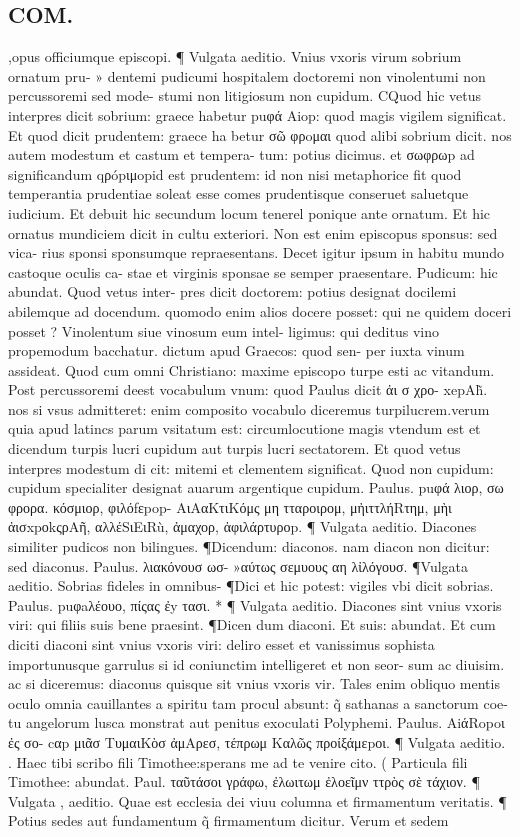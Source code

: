 \documentclass{article}
\begin{document}
\begin{pages}
\section*{COM. }
\marginpar{[ p.3 ]}\pstart ,opus officiumque episcopi. ¶ Vulgata aeditio. Vnius vxoris virum sobrium ornatum pru- » dentemi pudicumi hospitalem doctoremi non vinolentumi non percussoremi sed mode- stumi non litigiosum non cupidum. CQuod hic vetus interpres dicit sobrium: graece habetur puφά Aiop: quod magis vigilem significat. Et quod dicit prudentem: graece ha betur σῶ φρoμαι quod alibi sobrium dicit. nos autem modestum et castum et tempera- tum: potius dicimus. et σωφρωp ad significandum qρópιμopid est prudentem: id non nisi metaphorice fit quod temperantia prudentiae soleat esse comes prudentisque conseruet saluetque iudicium. Et debuit hic secundum locum tenerel ponique ante ornatum. Et hic ornatus mundiciem dicit in cultu exteriori. Non est enim episcopus sponsus: sed vica- rius sponsi sponsumque repraesentans. Decet igitur ipsum in habitu mundo castoque oculis ca- stae et virginis sponsae se semper praesentare. Pudicum: hic abundat. Quod vetus inter- pres dicit doctorem: potius designat docilemi abilemque ad docendum. quomodo enim alios docere posset: qui ne quidem doceri posset ? Vinolentum siue vinosum eum intel- ligimus: qui deditus vino propemodum bacchatur. dictum apud Graecos: quod sen- per iuxta vinum assideat. Quod cum omni Christiano: maxime episcopo turpe esti ac vitandum. Post percussoremi deest vocabulum vnum: quod Paulus dicit ἀι σ χρο- xepAh̃. nos si vsus admitteret: enim composito vocabulo diceremus turpilucrem.verum quia apud latincs parum vsitatum est: circumlocutione magis vtendum est et dicendum turpis lucri cupidum aut turpis lucri sectatorem. Et quod vetus interpres modestum di cit: mitemi et clementem significat. Quod non cupidum: cupidum specialiter designat auarum argentique cupidum. Paulus. puφά λιορ, σω φρορα. κόσμιορ, φιλόfεpop- AιΑαΚτιΚόμς μη τταροιρομ, μἠιττλήRτημ, μὴι ἀισxpοkςρAῆ, αλλέSιEιRù, ἀμαχορ, ἀφιλάρτυροp. ¶ Vulgata aeditio. Diacones similiter pudicos non bilingues. ¶Dicendum: diaconos. nam diacon non dicitur: sed diaconus. Paulus. λιακόνουσ ωσ- »αύτως σεμυους αη λἰλόγουσ. ¶Vulgata aeditio. Sobrias fideles in omnibus- ¶Dici et hic potest: vigiles vbi dicit sobrias. Paulus. puφaλέουο, πίςας ἐy τασι. * ¶ Vulgata aeditio. Diacones sint vnius vxoris viri: qui filiis suis bene praesint. ¶Dicen dum diaconi. Et suis: abundat. Et cum diciti diaconi sint vnius vxoris viri: deliro esset et vanissimus sophista importunusque garrulus si id coniunctim intelligeret et non seor- sum ac diuisim. ac si diceremus: diaconus quisque sit vnius vxoris vir. Tales enim obliquo mentis oculo omnia cauillantes a spiritu tam procul absunt: q̃ sathanas a sanctorum coe- tu angelorum lusca monstrat aut penitus exoculati Polyphemi. Paulus. AiάRopoι ἐς σο- cαp μιᾶσ ΤυμαιΚὸσ ἀμAρεσ, τέπρωμ Καλῶς προίξάμεpοι. ¶ Vulgata aeditio. . Haec tibi scribo fili Timothee:sperans me ad te venire cito. ( Particula fili Timothee: abundat. Paul. ταῦτάσοι γράφω, ἐλωιτωμ ἐλοεῖμν ττρὸς σὲ τάχιον. ¶ Vulgata , aeditio. Quae est ecclesia dei viuu columna et firmamentum veritatis. ¶ Potius sedes aut fundamentum q̃ firmamentum dicitur. Verum et sedem 
\end{pages}
\end{document}
